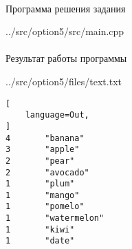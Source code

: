\paragraph{} Программа решения задания


{../src/option5/src/main.cpp}

\paragraph{} Результат работы программы


{../src/option5/files/text.txt}

\begin{lstlisting}[
    language=Out,
]
4       "banana"
3       "apple"
2       "pear"
2       "avocado"
1       "plum"
1       "mango"
1       "pomelo"
1       "watermelon"
1       "kiwi"
1       "date"
\end{lstlisting}